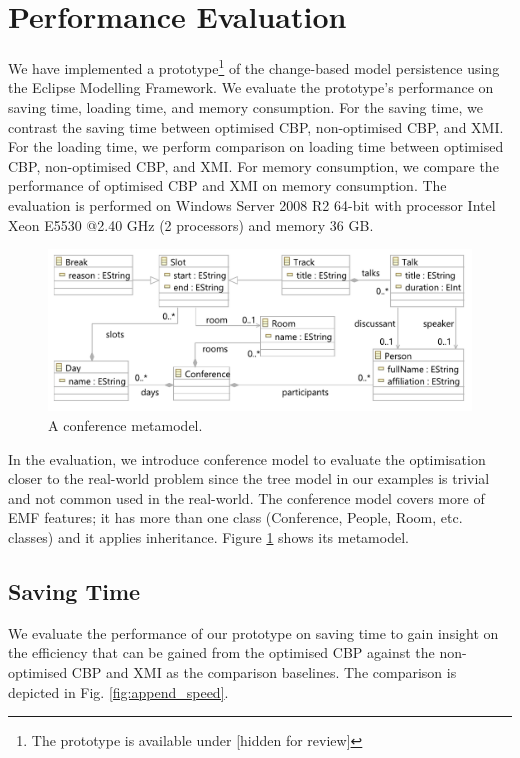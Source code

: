 \documentclass{llncs}
\begin{document}
\section{Performance Evaluation}
\label{sec:performance_evaluation}
We have implemented a prototype\footnote{The prototype is available under [hidden for review] %
} of the change-based model persistence using the Eclipse Modelling Framework. We evaluate the prototype's performance on saving time, loading time, and memory consumption. For the saving time, we contrast the saving time between optimised CBP, non-optimised CBP, and XMI. For the loading time, we perform comparison on loading time between optimised CBP, non-optimised CBP, and XMI. For memory consumption, we compare the performance of optimised CBP and XMI on memory consumption. The evaluation is performed on Windows Server 2008 R2 64-bit with processor Intel Xeon E5530 @2.40 GHz (2 processors) and memory 36 GB.

\begin{figure}[htbp]
    \centering
    \includegraphics[width=0.9\linewidth]{conference_metamodel}
    \caption{A conference metamodel.}   
    \label{fig:node_metamodel}
\end{figure}

In the evaluation, we introduce conference model to evaluate the optimisation closer to the real-world problem since the tree model in our examples is trivial and not common used in the real-world. The conference model covers more of EMF features; it has more than one class (Conference, People, Room, etc. classes) and it applies inheritance. Figure \ref{fig:node_metamodel} shows its metamodel. 

\subsection{Saving Time}
\label{subsec:saving_time_test}
We evaluate the performance of our prototype on saving time to gain insight on the efficiency that can be gained from the optimised CBP against the non-optimised CBP and XMI as the comparison baselines. The comparison is depicted in Fig. \ref{fig:append_speed}.
\end{document}
